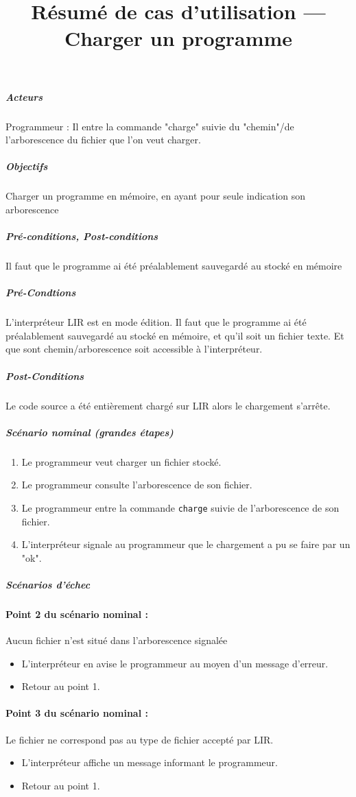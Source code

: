 \title{Résumé de cas d'utilisation --- Charger un programme} %

	\subparagraph{Acteurs}
	Programmeur : Il entre la commande "charge" suivie du "chemin"/de l'arborescence du fichier que l'on veut charger.

	\subparagraph{Objectifs}
	Charger un programme en mémoire, en ayant pour seule indication son arborescence

	\subparagraph{Pré-conditions, Post-conditions}
	Il faut que le programme ai été préalablement sauvegardé au stocké en mémoire

	\subparagraph{Pré-Condtions}
	L'interpréteur LIR est en mode édition.
	Il faut que le programme ai été préalablement sauvegardé au stocké en mémoire, et qu'il soit un fichier texte.
	Et que sont chemin/arborescence soit accessible à l'interpréteur.

	\subparagraph{Post-Conditions}
	Le code source a été entièrement chargé sur LIR alors le chargement s'arrête.

	\subparagraph{Scénario nominal (grandes étapes)}
	\begin{enumerate}
		\item Le programmeur veut charger un fichier stocké.

		\item Le programmeur consulte l'arborescence de son fichier.

		\item Le programmeur entre la commande \verb|charge| suivie de l'arborescence de son fichier.

		\item L'interpréteur signale au programmeur que le chargement a pu se faire par un "ok".
	\end{enumerate}

	\subparagraph{Scénarios d'échec}

	\paragraph{Point 2 du scénario nominal :} Aucun fichier n'est situé dans l'arborescence signalée
	\begin{itemize}
		\item L'interpréteur en avise le programmeur au moyen d'un message d'erreur.
		\item Retour au point 1.
	\end{itemize}

	\paragraph{Point 3 du scénario nominal :} Le fichier ne correspond pas au type de fichier accepté par LIR.
	\begin{itemize}
		\item L'interpréteur affiche un message informant le programmeur.
		\item Retour au point 1.
	\end{itemize}

